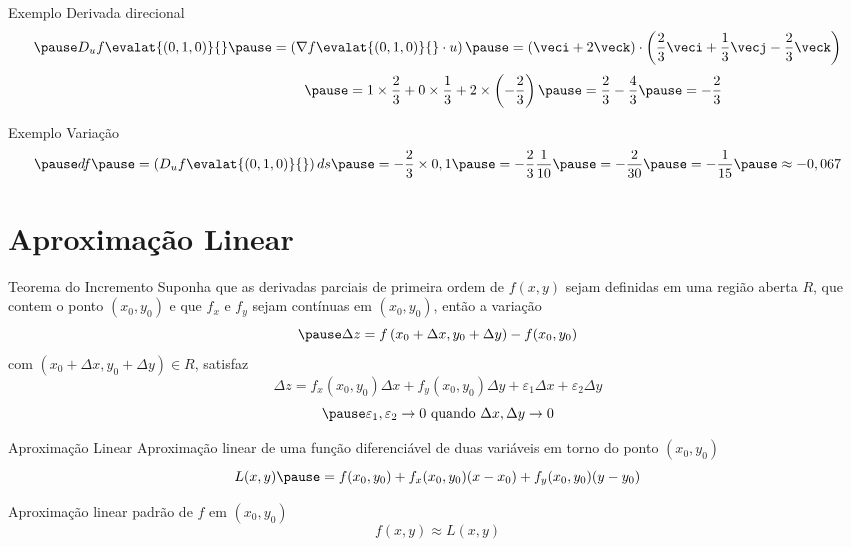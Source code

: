 \begin{frame}{Exemplo \theexemplo}
  Derivada direcional
  \[
    \pause
    D_u f\evalat{(0, 1, 0)}{}
    \pause
    = \left(\nabla f\evalat{(0, 1, 0)}{} \cdot u\right)
    \pause
    = \left(\veci + 2\veck\right)
    \cdot
    \left(\frac{2}{3} \veci + \frac{1}{3} \vecj - \frac{2}{3} \veck\right)
  \]
  \[
    \hphantom{D_u f\evalat{(0, 1, 0)}{}}
    \pause
    = 1\times\frac{2}{3} + 0\times\frac{1}{3} + 2 \times\left(- \frac{2}{3}\right)
    \pause
    = \frac{2}{3} - \frac{4}{3}
    \pause
    = -\frac{2}{3}
  \]
\end{frame}

\begin{frame}{Exemplo \theexemplo}
  Variação
  \[
    \pause
    df
    \pause
    = \left(D_u f\evalat{(0, 1, 0)}{}\right) ds
    \pause
    = -\frac{2}{3}\times 0,1
    \pause
    = -\frac{2}{3} \frac{1}{10}
    \pause
    = -\frac{2}{30}
    \pause
    = -\frac{1}{15}
    \pause
    \approx -0,067
  \]
\end{frame}

\section{Aproximação Linear}

\begin{frame}{Teorema do Incremento}
  Suponha que as derivadas parciais de primeira ordem de $f(x, y)$ sejam
  definidas em uma região aberta $R$, que contem o ponto $(x_0, y_0)$
  \pause
  e que $f_x$ e $f_y$ sejam contínuas em $(x_0, y_0)$,
  \pause
  então a variação
  \[
    \pause
    \Delta z
    = f\left(x_0+\Delta x, y_0 + \Delta y\right)
    - f(x_0, y_0)
  \]
  \pause
  com \(\left(x_0+\Delta x, y_0 + \Delta y\right)\in R\),
  \pause
  satisfaz
  \[
    \Delta z
    = f_x(x_0, y_0) \Delta x
    + f_y(x_0, y_0) \Delta y
    + \varepsilon_1 \Delta x
    + \varepsilon_2 \Delta y
  \]
  \[
    \pause
    \varepsilon_1, \varepsilon_2 \to 0 \text{ quando } \Delta x, \Delta y \to 0
  \]
\end{frame}

\begin{frame}{Aproximação Linear}
  Aproximação linear de uma função diferenciável de duas variáveis
  em torno do ponto \((x_0, y_0)\)
  \pause
  \[
    L(x, y)
    \pause
    = f(x_0, y_0)
    + f_x(x_0, y_0)(x-x_0)
    + f_y(x_0, y_0)(y-y_0)
  \]

  \pause
  Aproximação linear padrão de $f$ em \((x_0, y_0)\)
  \[
    f(x, y) \approx L(x, y)
  \]
\end{frame}

